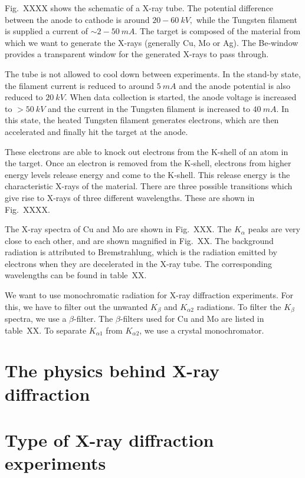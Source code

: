 \documentclass[11pt,a4paper]{article}
\begin{document}
		Fig.~XXXX shows the schematic of a X-ray tube. The potential difference between the anode to cathode is around $20-60~\si{kV},$ while the Tungsten filament is supplied a current of $\sim 2-50~\si{mA}.$ The target is composed of the material from which we want to generate the X-rays (generally Cu, Mo or Ag). The Be-window provides a transparent window for the generated X-rays to pass through.
		
		The tube is not allowed to cool down between experiments. In the stand-by state, the filament current is reduced to around $\SI{5}{mA}$ and the anode potential is also reduced to $\SI{20}{kV}.$ When data collection is started, the anode voltage is increased to $>\SI{50}{kV}$ and the current in the Tungsten filament is increased to $\SI{40}{mA}.$ In this state, the heated Tungsten filament generates electrons, which are then accelerated and finally hit the target at the anode.
		
		These electrons are able to knock out electrons from the K-shell of an atom in the target. Once an electron is removed from the K-shell, electrons from higher energy levels release energy and come to the K-shell. This release energy is the characteristic X-rays of the material. There are three possible transitions which give rise to X-rays of three different wavelengths. These are shown in Fig.~XXXX.
		
		The X-ray spectra of Cu and Mo are shown in Fig.~XXX. The $K_\alpha$ peaks are very close to each other, and are shown magnified in Fig.~XX. The background radiation is attributed to Bremstrahlung, which is the radiation emitted by electrons when they are decelerated in the X-ray tube. The corresponding wavelengths can be found in table~XX.
		
		We want to use monochromatic radiation for X-ray diffraction experiments. For this, we have to filter out the unwanted $K_\beta$ and $K_{\alpha2}$ radiations. To filter the $K_\beta$ spectra, we use a $\beta$-filter. The  $\beta$-filters used for Cu and Mo are listed in table~XX. To separate $K_{\alpha1}$ from $K_{\alpha2}$, we use a crystal monochromator.
	
	\section{The physics behind X-ray diffraction}
	
	
	\section{Type of X-ray diffraction experiments}
	
\end{document}
